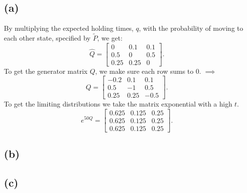 \documentclass{article}
\begin{document}
\subsection{(a)}
By multiplying the expected holding times, $q$, with the probability of moving to each other state, specified by $\tilde{P}$, we get:
$$ \hat{Q} = \begin{bmatrix}
0 & 0.1 & 0.1\\
0.5 & 0 & 0.5\\
0.25 & 0.25 & 0
\end{bmatrix}.$$
To get the generator matrix $Q$, we make sure each row sums to 0. $\implies$
$$ Q = \begin{bmatrix}
-0.2 & 0.1 & 0.1\\
0.5 & -1 & 0.5\\
0.25 & 0.25 & -0.5
\end{bmatrix}.$$
To get the limiting distributions we take the matrix exponential with a high $t$.
$$ e^{50Q} = \begin{bmatrix}
0.625 & 0.125 & 0.25\\
0.625 & 0.125 & 0.25\\
0.625 & 0.125 & 0.25
\end{bmatrix}.$$

\subsection{(b)}
\subsection{(c)}

\begin{comment}
	\appendix
	\section{Appendix, R code}
	
\end{comment}
\end{document}
